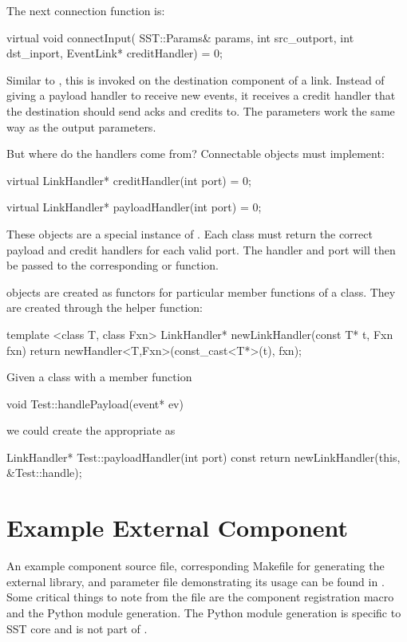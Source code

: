 The next connection function is:
\begin{CppCode}
  virtual void connectInput(
    SST::Params& params,
    int src_outport,
    int dst_inport,
    EventLink* creditHandler) = 0;
\end{CppCode}
Similar to , this is invoked on the destination component of a link.
Instead of giving a payload handler to receive new events,
it receives a credit handler that the destination should send acks and credits to.
The parameters work the same way as the output parameters.

But where do the handlers come from? Connectable objects must implement:

\begin{CppCode}
virtual LinkHandler* creditHandler(int port) = 0;

virtual LinkHandler* payloadHandler(int port) = 0;
\end{CppCode}

These  objects are a special instance of .
Each class must return the correct payload and credit handlers for each valid port.
The handler and port will then be passed to the corresponding  or  function.

 objects are created as functors for particular member functions of a class.
They are created through the helper function:

\begin{CppCode}
template <class T, class Fxn>
LinkHandler* newLinkHandler(const T* t, Fxn fxn){
  return newHandler<T,Fxn>(const_cast<T*>(t), fxn);
}
\end{CppCode}
Given a class  with a member function

\begin{CppCode}
void Test::handlePayload(event* ev)
\end{CppCode}
we could create the appropriate  as

\begin{CppCode}
LinkHandler* Test::payloadHandler(int port) const {
  return newLinkHandler(this, &Test::handle);
}
\end{CppCode}

\section{Example External Component}
An example component source file, corresponding Makefile for generating the external library, and parameter file demonstrating its usage can be found in .
Some critical things to note from the file  are the component registration macro and the Python module generation.
The Python module generation is specific to SST core and is not part of \sstmacro.

